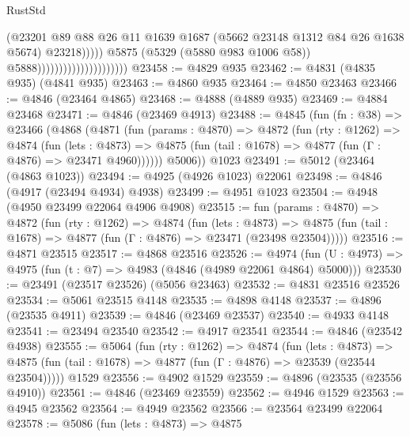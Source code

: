 \begin{lexlean}{RustStd}
\begin{coremodule}
                                                      (@23201
                                                        @89
                                                        @88
                                                        @26
                                                        @11
                                                        @1639
                                                        @1687
                                                        (@5662 @23148 @1312 @84 @26 @1638 @5674)
                                                        @23218)))))
                                              @5875
                                              (@5329 (@5880 @983 @1006 @58))
                                              @5888)))))))))))))))))))))
@23458 := @4829 @935
@23462 := @4831 (@4835 @935) (@4841 @935)
@23463 := @4860 @935
@23464 := @4850 @23463
@23466 := @4846 (@23464 @4865)
@23468 := @4888 (@4889 @935)
@23469 := @4884 @23468
@23471 := @4846 (@23469 @4913)
@23488 := @4845
    (fun (fn : @38) =>
    @23466
      (@4868
        (@4871
          (fun (params : @4870) =>
          @4872
            (fun (rty : @1262) =>
            @4874
              (fun (lets : @4873) =>
              @4875 (fun (tail : @1678) => @4877 (fun (Γ : @4876) => @23471 @4960))))))
        @5006))
    @1023
@23491 := @5012 (@23464 (@4863 @1023))
@23494 := @4925 (@4926 @1023) @22061
@23498 := @4846 (@4917 (@23494 @4934) @4938)
@23499 := @4951 @1023
@23504 := @4948 (@4950 @23499 @22064 @4906 @4908)
@23515 := fun (params : @4870) =>
  @4872
    (fun (rty : @1262) =>
    @4874
      (fun (lets : @4873) =>
      @4875 (fun (tail : @1678) => @4877 (fun (Γ : @4876) => @23471 (@23498 @23504)))))
@23516 := @4871 @23515
@23517 := @4868 @23516
@23526 := @4974
    (fun (U : @4973) => @4975 (fun (t : @7) => @4983 (@4846 (@4989 @22061 @4864) @5000)))
@23530 := @23491 (@23517 @23526) (@5056 @23463)
@23532 := @4831 @23516 @23526
@23534 := @5061 @23515 @4148
@23535 := @4898 @4148
@23537 := @4896 (@23535 @4911)
@23539 := @4846 (@23469 @23537)
@23540 := @4933 @4148
@23541 := @23494 @23540
@23542 := @4917 @23541
@23544 := @4846 (@23542 @4938)
@23555 := @5064
    (fun (rty : @1262) =>
    @4874
      (fun (lets : @4873) =>
      @4875 (fun (tail : @1678) => @4877 (fun (Γ : @4876) => @23539 (@23544 @23504)))))
    @1529
@23556 := @4902 @1529
@23559 := @4896 (@23535 (@23556 @4910))
@23561 := @4846 (@23469 @23559)
@23562 := @4946 @1529
@23563 := @4945 @23562
@23564 := @4949 @23562
@23566 := @23564 @23499 @22064
@23578 := @5086
    (fun (lets : @4873) =>
    @4875

\end{coremodule}
\end{lexlean}
